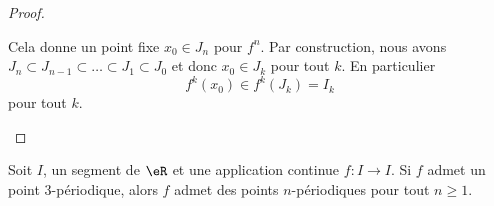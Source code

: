 \begin{proof}
\begin{subproof}
		Cela donne un point fixe \( x_0\in J_n\) pour \( f^n\). Par construction, nous avons \( J_n\subset J_{n-1}\subset\ldots\subset J_1\subset J_0\) et donc \( x_0\in J_k\) pour tout \( k\). En  particulier
		\begin{equation}
			f^k(x_0)\in f^k(J_k)=I_k
		\end{equation}
		pour tout \( k\).
	\end{subproof}
\end{proof}

\begin{theorem}
	Soit \( I\), un segment de \( \eR\) et une application continue \( f\colon I\to I\). Si \( f\) admet un point \( 3\)-périodique, alors \( f\) admet des points \( n\)-périodiques pour tout \( n\geq 1\).
\end{theorem}

